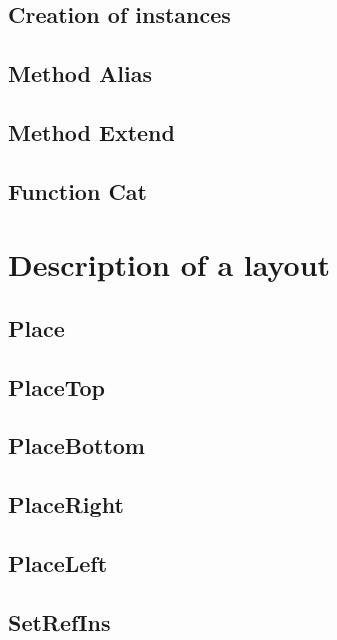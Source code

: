 \documentclass[12pt]{article}
\begin{document}
    \subsection{Creation of instances}
    \label{secinst}
    
    \subsection{Method Alias}
    \label{secalias}
    
    \subsection{Method Extend}
    \label{secextend}
    
    \subsection{Function Cat}
    \label{seccat}
        
    
\newpage
\section{Description of a layout}
\label{seclayout}

    \subsection{Place}
    \label{secplace}
    
    \subsection{PlaceTop}
    \label{sectop}
    
    \subsection{PlaceBottom}
    \label{secbottom}
    
    \subsection{PlaceRight}
    \label{secright}
    
    \subsection{PlaceLeft}
    \label{secleft}
    
    \subsection{SetRefIns}
    \label{secsetrefins}
    
\end{document}

